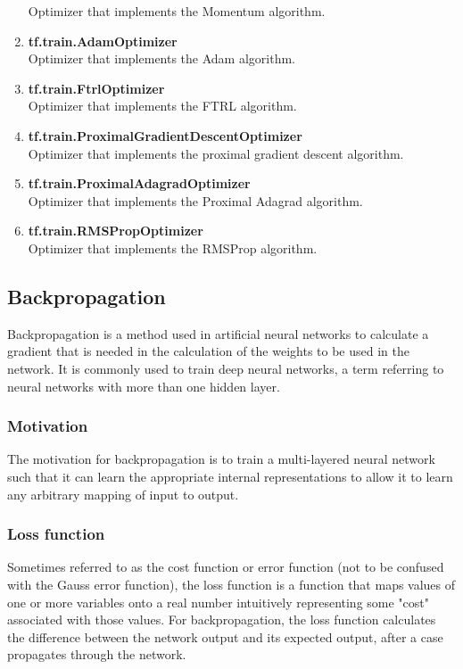 \begin{enumerate}
      Optimizer that implements the Momentum algorithm.
      \item\textbf{tf.train.AdamOptimizer}\\
      Optimizer that implements the Adam algorithm.\cite{DBLP:journals/corr/KingmaB14}
      \item\textbf{tf.train.FtrlOptimizer}\\
      Optimizer that implements the FTRL algorithm.\cite{41159}
      \item\textbf{tf.train.ProximalGradientDescentOptimizer}\\
      Optimizer that implements the proximal gradient descent algorithm.\cite{NIPS2009_3793}
      \item\textbf{tf.train.ProximalAdagradOptimizer}\\
      Optimizer that implements the Proximal Adagrad algorithm.\cite{NIPS2009_3793}
      \item\textbf{tf.train.RMSPropOptimizer}\\
      Optimizer that implements the RMSProp algorithm.\cite{web027}
      \end{enumerate}
      \subsection{Backpropagation}
      Backpropagation is a method used in artificial neural networks to calculate a gradient that is needed in the calculation of the weights to be used in the network. It is commonly used to train deep neural networks, a term referring to neural networks with more than one hidden layer.
      \subsubsection{Motivation}
      The motivation for backpropagation is to train a multi-layered neural network such that it can learn the appropriate internal representations to allow it to learn any arbitrary mapping of input to output.
      \subsubsection{Loss function}
      Sometimes referred to as the cost function or error function (not to be confused with the Gauss error function), the loss function is a function that maps values of one or more variables onto a real number intuitively representing some "cost" associated with those values. For backpropagation, the loss function calculates the difference between the network output and its expected output, after a case propagates through the network.
